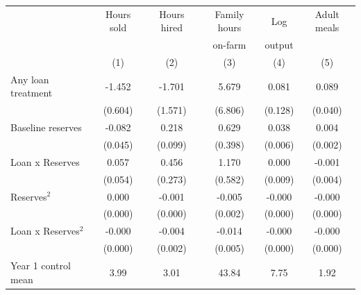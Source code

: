 \begin{tabular}{l ccccc}
\hline
 & Hours sold & Hours hired & Family hours & Log & Adult meals \\
 & & & on-farm & output & \\
 & (1) & (2) & (3) & (4) & (5) \\
\hline
Any loan treatment & -1.452 & -1.701 & 5.679 & 0.081 & 0.089 \\
 & (0.604) & (1.571) & (6.806) & (0.128) & (0.040) \\
Baseline reserves & -0.082 & 0.218 & 0.629 & 0.038 & 0.004 \\
 & (0.045) & (0.099) & (0.398) & (0.006) & (0.002) \\
Loan x Reserves & 0.057 & 0.456 & 1.170 & 0.000 & -0.001 \\
 & (0.054) & (0.273) & (0.582) & (0.009) & (0.004) \\
Reserves$^2$ & 0.000 & -0.001 & -0.005 & -0.000 & -0.000 \\
 & (0.000) & (0.000) & (0.002) & (0.000) & (0.000) \\
Loan x Reserves$^2$ & -0.000 & -0.004 & -0.014 & -0.000 & -0.000 \\
 & (0.000) & (0.002) & (0.005) & (0.000) & (0.000) \\
Year 1 control mean & 3.99 & 3.01 & 43.84 & 7.75 & 1.92 \\
\hline
\end{tabular}
